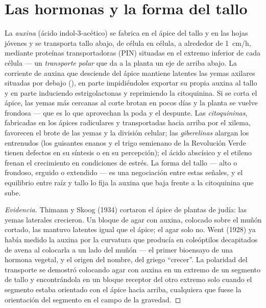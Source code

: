 \section{Las hormonas y la forma del tallo}

\begin{proposition}\label{prop:b2:plant-meristems:apical}
La \emph{auxina} (ácido indol-3-acético) se fabrica en el ápice del tallo y
en las hojas jóvenes y se transporta tallo abajo, de célula en célula, a
alrededor de \qty{1}{cm/h}, mediante proteínas transportadoras (PIN)
situadas en el extremo inferior de cada célula --- un \emph{transporte
polar} que da a la planta un eje de arriba abajo. La corriente de auxina
que desciende del ápice mantiene latentes las yemas axilares situadas por
debajo (\emph{}), en parte impidiéndoles exportar su
propia auxina al tallo y en parte induciendo estrigolactonas y
reprimiendo la citoquinina. Si se corta el ápice, las yemas más cercanas
al corte brotan en pocos días y la planta se vuelve frondosa --- que es lo
que aprovechan la poda y el despunte. Las \emph{citoquininas}, fabricadas
en los ápices radiculares y transportadas hacia arriba por el xilema,
favorecen el brote de las yemas y la división celular; las
\emph{giberelinas} alargan los entrenudos (los guisantes enanos y el trigo
semienano de la Revolución Verde tienen defectos en su síntesis o en su
percepción); el ácido abscísico y el etileno frenan el crecimiento en
condiciones de estrés. La forma del tallo --- alto o frondoso, erguido o
extendido --- es una negociación entre estas señales, y el equilibrio
entre raíz y tallo lo fija la auxina que baja frente a la citoquinina que
sube.
\end{proposition}
\begin{proof}[Evidencia]
Thimann y Skoog (1934) cortaron el ápice de plantas de judía: las yemas
laterales crecieron. Un bloque de agar con auxina, colocado sobre el
muñón cortado, las mantuvo latentes igual que el ápice; el agar solo no.
Went (1928) ya había medido la auxina por la curvatura que producía en
coleóptilos decapitados de avena al colocarla a un lado del muñón --- el
primer bioensayo de una hormona vegetal, y el origen del nombre, del
griego ``crecer''. La polaridad del transporte se demostró colocando agar
con auxina en un extremo de un segmento de tallo y encontrándola en un
bloque receptor del otro extremo solo cuando el segmento estaba orientado
con el ápice hacia arriba, cualquiera que fuese la orientación del
segmento en el campo de la gravedad.
\end{proof}

